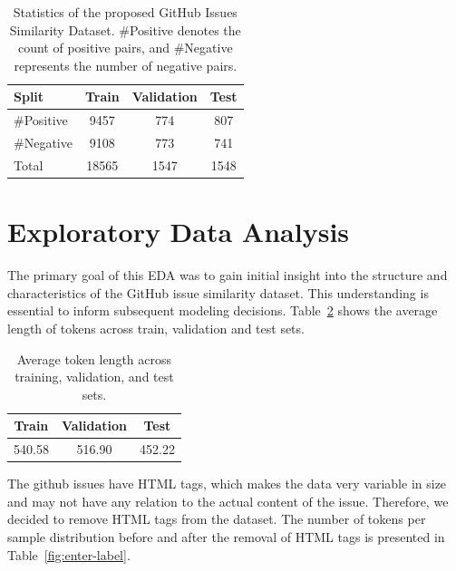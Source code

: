 \documentclass[
	a4paper, %
	10pt, %
	unnumberedsections, %
	twoside, %
]{LTJournalArticle}
\begin{document}
\begin{table}[h]
    \centering
    \caption{Statistics of the proposed GitHub Issues Similarity Dataset. \#Positive denotes the count of positive pairs, and \#Negative represents the number of negative pairs.}
    \label{tab:github_statistics}
    \begin{tabular}{lccc}
        \toprule
        Split & Train & Validation & Test \\
        \midrule
        \#Positive & 9457 & 774 & 807 \\
        \#Negative & 9108 & 773 & 741 \\
        \midrule
        Total & 18565 & 1547 & 1548 \\
        \bottomrule
    \end{tabular}
\end{table}


\section{Exploratory Data Analysis}
The primary goal of this EDA was to gain initial insight into the structure and characteristics of the GitHub issue similarity dataset. This understanding is essential to inform subsequent modeling decisions. Table~\ref{tab:token_length} shows the average length of tokens across train, validation and test sets.

\begin{table}[h]
    \centering
    \caption{Average token length across training, validation, and test sets.}
    \label{tab:token_length}
    \begin{tabular}{ccc}
        \toprule
         Train & Validation & Test \\
        \midrule
         540.58& 516.90& 452.22\\
    \end{tabular}
\end{table}

The github issues have HTML tags, which makes the data very variable in size and may not have any relation to the actual content of the issue. Therefore, we decided to remove HTML tags from the dataset. The number of tokens per sample distribution before and after the removal of HTML tags is presented in Table~\ref{fig:enter-label}.
\end{document}
